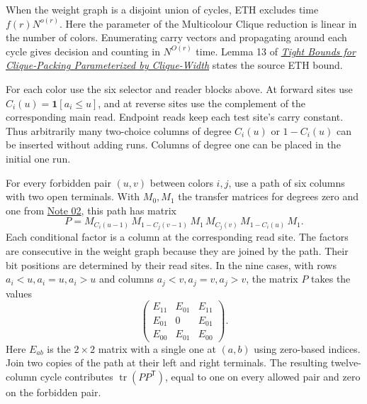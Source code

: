\documentclass[11pt,a4paper]{article}
\numberwithin{equation}{section}
\begin{document}
When the weight graph is a disjoint union of cycles, ETH excludes time \(f(r)N^{o(r)}\). Here the parameter of the Multicolour Clique reduction is linear in the number of colors. Enumerating carry vectors and propagating around each cycle gives decision and counting in \(N^{O(r)}\) time. Lemma 13 of \href{https://drops.dagstuhl.de/storage/00lipics/lipics-vol388-esa2026/html/LIPIcs.ESA.2026.115/LIPIcs.ESA.2026.115.html}{\emph{Tight Bounds for Clique-Packing Parameterized by Clique-Width}} states the source ETH bound.

For each color use the six selector and reader blocks above. At forward sites use \(C_i(u)=\mathbf1[a_i\le u]\), and at reverse sites use the complement of the corresponding main read. Endpoint reads keep each test site's carry constant. Thus arbitrarily many two-choice columns of degree \(C_i(u)\) or \(1-C_i(u)\) can be inserted without adding runs. Columns of degree one can be placed in the initial one run.

For every forbidden pair \((u,v)\) between colors \(i,j\), use a path of six columns with two open terminals. With \(M_0,M_1\) the transfer matrices for degrees zero and one from \href{https://github.com/Leonardo-Italia/p-vs-np-open-notebook/blob/b07860a0b854bd3f898114aa6a2476fcbab1cf56/research/02-counting-and-parameters.md}{Note 02}, this path has matrix
\begin{equation}\label{eq:threshold-transfer}
P=M_{C_i(u-1)}\,M_{1-C_j(v-1)}\,M_1\,
M_{C_j(v)}\,M_{1-C_i(u)}\,M_1 .
\end{equation}
Each conditional factor is a column at the corresponding read site. The factors are consecutive in the weight graph because they are joined by the path. Their bit positions are determined by their read sites. In the nine cases, with rows \(a_i<u,a_i=u,a_i>u\) and columns \(a_j<v,a_j=v,a_j>v\), the matrix \(P\) takes the values
\begin{equation}\label{eq:threshold-cases}
\begin{pmatrix}
E_{11}&E_{01}&E_{11}\\
E_{01}&0&E_{01}\\
E_{00}&E_{01}&E_{00}
\end{pmatrix}.
\end{equation}
Here \(E_{ab}\) is the \(2\times2\) matrix with a single one at \((a,b)\) using zero-based indices. Join two copies of the path at their left and right terminals. The resulting twelve-column cycle contributes \(\operatorname{tr}(PP^{\mathsf T})\), equal to one on every allowed pair and zero on the forbidden pair.
\end{document}
